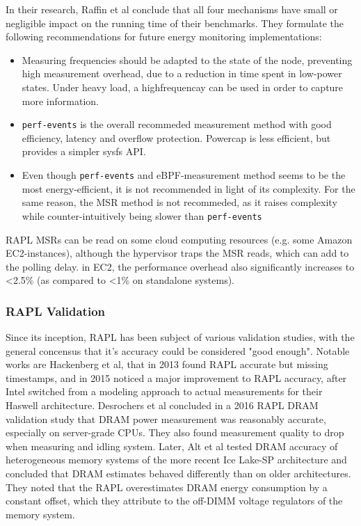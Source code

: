 In their research, Raffin et al conclude that all four mechanisms have small or negligible impact on the running time of their benchmarks. They formulate the following recommendations for future energy monitoring implementations:
\begin{itemize}
    \item Measuring frequencies should be adapted to the state of the node, preventing high measurement overhead, due to a reduction in time spent in low-power states. Under heavy load, a highfrequencay can be used in order to capture more information.
    \item \texttt{perf-events} is the overall recommeded measurement method with good efficiency, latency and overflow protection. Powercap is less efficient, but provides a simpler sysfs API.
    \item Even though \texttt{perf-events} and eBPF-measurement method seems to be the most energy-efficient, it is not recommended in light of its complexity. For the same reason, the MSR method is not recommeded, as it raises complexity while counter-intuitively being slower than \texttt{perf-events}
\end{itemize}

RAPL MSRs can be read on some cloud computing resources (e.g. some Amazon EC2-instances), although the hypervisor traps the MSR reads, which can add to the polling delay. in EC2, the performance overhead also significantly increases to <2.5\% (as compared to <1\% on standalone systems)\parencite{jay2023experimental}.

\subsubsection{RAPL Validation}
\label{sec:raplvalidation}
Since its inception, RAPL has been subject of various validation studies, with the general concensus that it's accuracy could be considered "good enough"\parencite{raffin2024dissecting}. Notable works are Hackenberg et al, that in 2013 found RAPL accurate but missing timestamps\parencite{hackenberg2013power}, and in 2015 noticed a major improvement to RAPL accuracy, after Intel switched from a modeling approach to actual measurements for their Haswell architecture\parencite{hackenberg2015energy}. Desrochers et al concluded in a 2016 RAPL DRAM validation study\parencite{desrochers2016validation} that DRAM power measurement was reasonably accurate, especially on server-grade CPUs. They also found measurement quality to drop when measuring and idling system. Later, Alt et al\parencite{alt2024experimental} tested DRAM accuracy of heterogeneous memory systems of the more recent Ice Lake-SP architecture and concluded that DRAM estimates behaved differently than on older architectures. They noted that the RAPL overestimates DRAM energy consumption by a constant offset, which they attribute to the off-DIMM voltage regulators of the memory system.

